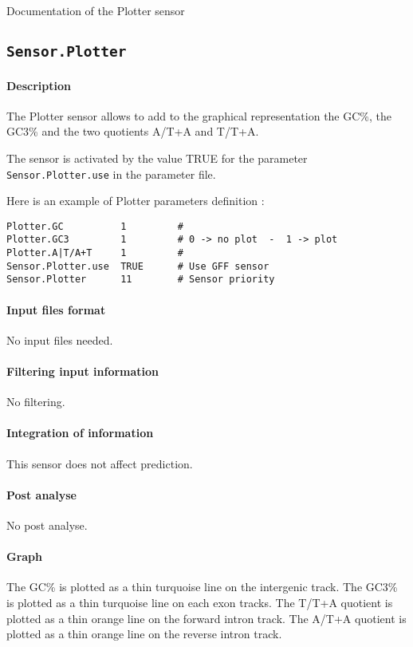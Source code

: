  Documentation of the Plotter sensor

\subsection{\texttt{Sensor.Plotter}}

\paragraph{Description}

The Plotter sensor allows to add to the graphical representation the GC\%,
the GC3\% and the two quotients A/T+A and T/T+A.

The sensor is activated by the value TRUE for the parameter
\texttt{Sensor.Plotter.use} in the parameter file.

Here is an example of Plotter parameters definition :
\begin{Verbatim}[fontsize=\small]
Plotter.GC          1         #
Plotter.GC3         1         # 0 -> no plot  -  1 -> plot
Plotter.A|T/A+T     1         #
Sensor.Plotter.use  TRUE      # Use GFF sensor
Sensor.Plotter      11        # Sensor priority
\end{Verbatim}

\paragraph{Input files format}

No input files  needed.

\paragraph{Filtering input information}

No filtering.

\paragraph{Integration of information}

This sensor does not affect prediction.

\paragraph{Post analyse}

No post analyse.

\paragraph{Graph}

The GC\% is plotted as a thin turquoise line on the intergenic track.
The GC3\% is plotted as a thin turquoise line on each exon tracks.
The T/T+A quotient is plotted as a thin orange line on the forward intron
track.
The A/T+A quotient is plotted as a thin orange line on the reverse intron
track.
